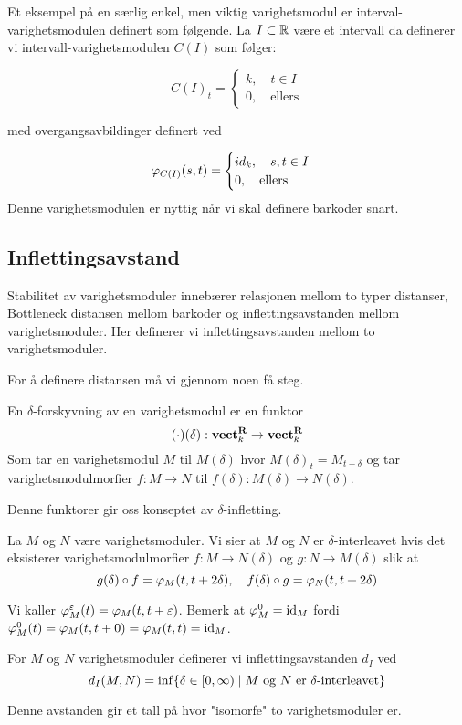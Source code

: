 Et eksempel på en særlig enkel, men viktig varighetsmodul er interval-varighetsmodulen definert som følgende.
La $I\subset\mathbb{R}$ være et intervall da definerer vi intervall-varighetsmodulen $C(I)$ som følger:

\[C(I)_t = 
\begin{cases}
    k,\quad t\in I\\
0,\quad\text{ellers}
\end{cases}
\]

med overgangsavbildinger definert ved

\[\varphi_{C(I)}(s,t) = 
\begin{cases}
id_k,\quad s,t\in I\\
0, \quad\text{ellers}
\end{cases}
\]
Denne varighetsmodulen er nyttig når vi skal definere barkoder snart.

\subsection{Inflettingsavstand}
Stabilitet av varighetsmoduler innebærer relasjonen mellom to typer distanser, Bottleneck distansen mellom barkoder
og inflettingsavstanden mellom varighetsmoduler. Her definerer vi inflettingsavstanden mellom to varighetsmoduler.

For å definere distansen må vi gjennom noen få steg.
\begin{definisjon}\label{Def:DShift}
	En $\delta$-forskyvning av en varighetsmodul er en funktor
	\[(\cdot)(\delta): \textnormal{\textbf{vect}}_k^{\textnormal{\textbf{R}}}\to \textnormal{\textbf{vect}}_k^{\textnormal{\textbf{R}}}\]
	Som tar en varighetsmodul $M$ til $M(\delta)$ hvor $M(\delta)_t = M_{t+\delta}$ og tar varighetsmodulmorfier $f:M\to N$ til $f(\delta):M(\delta)\to N(\delta)$.
\end{definisjon}

Denne funktorer gir oss konseptet av $\delta$-infletting.

\begin{definisjon}\label{Def:infletting}
	La $M$ og $N$ være varighetsmoduler. Vi sier at $M$ og $N$ er $\delta$-interleavet hvis det eksisterer varighetsmodulmorfier $f:M\to N(\delta)$ og $g:N\to M(\delta)$ slik at
	\[g(\delta)\circ f = \varphi_M(t,t+2\delta),\quad f(\delta)\circ g = \varphi_N(t,t+2\delta)\]
\end{definisjon}
Vi kaller $\varphi^\varepsilon_M(t) = \varphi_M(t,t+\varepsilon)$. Bemerk at $\varphi^0_M=\textnormal{id}_M$ fordi $\varphi^0_M(t) = \varphi_M(t,t+0)=\varphi_M(t,t)=\textnormal{id}_M$.

\begin{definisjon}\label{Def:label}
	For $M$ og $N$ varighetsmoduler definerer vi inflettingsavstanden $d_I$ ved
	\[d_I(M,N) = \inf\{\delta\in [0,\infty)\mid \text{$M$ og $N$ er $\delta$-interleavet}\}\]
\end{definisjon}
Denne avstanden gir et tall på hvor "isomorfe" to varighetsmoduler er.

